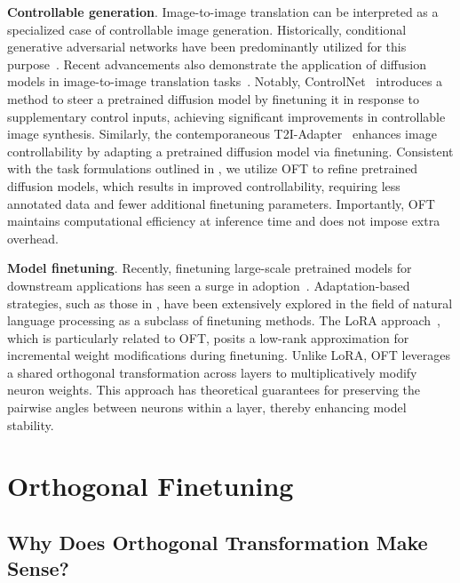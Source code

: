 \textbf{Controllable generation}. Image-to-image translation can be interpreted as a specialized case of controllable image generation. Historically, conditional generative adversarial networks have been predominantly utilized for this purpose~\cite{isola2017image,zhu2017toward,wang2018high,park2019semantic,choi2018stargan}. Recent advancements also demonstrate the application of diffusion models in image-to-image translation tasks~\cite{saharia2022palette,voynov2022sketch,wang2022pretraining}. Notably, ControlNet~\cite{zhang2023adding} introduces a method to steer a pretrained diffusion model by finetuning it in response to supplementary control inputs, achieving significant improvements in controllable image synthesis. Similarly, the contemporaneous T2I-Adapter~\cite{mou2023t2i} enhances image controllability by adapting a pretrained diffusion model via finetuning. Consistent with the task formulations outlined in \cite{zhang2023adding,mou2023t2i}, we utilize OFT to refine pretrained diffusion models, which results in improved controllability, requiring less annotated data and fewer additional finetuning parameters. Importantly, OFT maintains computational efficiency at inference time and does not impose extra overhead.

\textbf{Model finetuning}. Recently, finetuning large-scale pretrained models for downstream applications has seen a surge in adoption~\cite{devlin2018bert,brown2020language,he2022masked}. Adaptation-based strategies, such as those in \cite{hulora2022,houlsby2019parameter,pfeiffer2020adapterfusion}, have been extensively explored in the field of natural language processing as a subclass of finetuning methods. The LoRA approach~\cite{hulora2022}, which is particularly related to OFT, posits a low-rank approximation for incremental weight modifications during finetuning. Unlike LoRA, OFT leverages a shared orthogonal transformation across layers to multiplicatively modify neuron weights. This approach has theoretical guarantees for preserving the pairwise angles between neurons within a layer, thereby enhancing model stability.

\section{Orthogonal Finetuning}

\subsection{Why Does Orthogonal Transformation Make Sense?}

